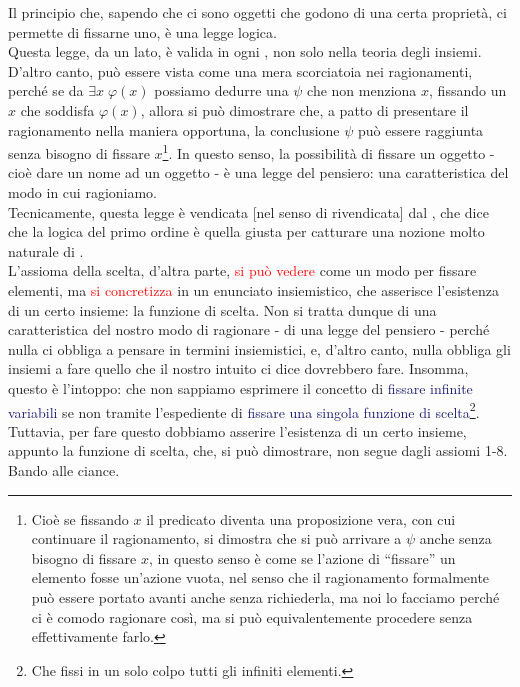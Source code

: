 Il principio che, sapendo che ci sono oggetti che godono di una certa propriet\`a, ci permette di fissarne uno, \`e una legge logica.\\
Questa legge, da un lato, \`e valida in ogni , non solo nella teoria degli insiemi. D'altro canto, pu\`o essere vista come una mera scorciatoia nei ragionamenti, perch\'e se da $\exists x \; \varphi(x)$ possiamo dedurre una $\psi$ che non menziona $x$,
fissando un $x$ che soddisfa $\varphi(x)$, allora si pu\`o dimostrare che, a patto di presentare il ragionamento nella maniera opportuna, la conclusione $\psi$ pu\`o essere raggiunta senza bisogno di fissare $x$\footnote{Cio\`e se fissando $x$ il predicato diventa una proposizione vera, con cui continuare il ragionamento, si dimostra che si pu\`o arrivare a $\psi$ anche senza 
bisogno di fissare $x$, in questo senso \`e come se l'azione di ``fissare'' un elemento fosse un'azione vuota, nel senso che il ragionamento formalmente pu\`o essere portato avanti anche senza richiederla, ma noi lo facciamo perch\'e ci \`e comodo ragionare cos\`i, ma si pu\`o equivalentemente procedere senza effettivamente farlo.}. In questo senso, la possibilit\`a
di fissare un oggetto - cio\`e dare un nome ad un oggetto - \`e una legge del pensiero: una caratteristica del modo in cui ragioniamo.\\
Tecnicamente, questa legge \`e vendicata [nel senso di rivendicata] dal , che dice che la logica del primo ordine \`e quella giusta per catturare una nozione molto naturale di .\\
L'assioma della scelta, d'altra parte, \textcolor{red}{si pu\`o vedere} come un modo per fissare elementi, ma \textcolor{red}{si concretizza} in un enunciato insiemistico, che asserisce l'esistenza di un certo insieme: la funzione di scelta.
Non si tratta dunque di una caratteristica del nostro modo di ragionare - di una legge del pensiero - perch\'e nulla ci obbliga a pensare in termini insiemistici, e, d'altro canto, nulla obbliga gli insiemi a fare quello che il nostro intuito ci dice dovrebbero fare.
Insomma, questo \`e l'intoppo: che non sappiamo esprimere il concetto di \textcolor{MidnightBlue}{fissare infinite variabili} se non tramite l'espediente di \textcolor{MidnightBlue}{fissare una singola funzione di scelta}\footnote{Che fissi in un solo colpo tutti gli infiniti elementi.}. Tuttavia, per fare questo dobbiamo asserire l'esistenza di un certo insieme, appunto la funzione di scelta,
che, si pu\`o dimostrare, non segue dagli assiomi 1-8. Bando alle ciance.

